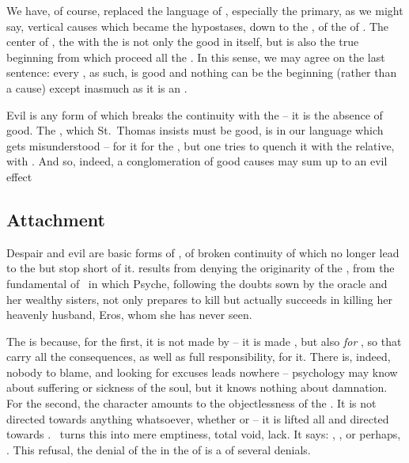 {{We have, of course, replaced the language of , especially the
primary, as we might say, vertical causes which became the hypostases, down to
the , of the  of . The center
of , the  with the  is not only the
good in itself, but is also the true beginning from which proceed all the
. In this sense, we may agree on the last sentence: every
, as such, is good and nothing can be the beginning (rather than a
cause) except inasmuch as it is an . 

Evil is any form of  which breaks the continuity with the
 -- it is the absence of good. The , which St.~Thomas insists must be good, is in our language
 which gets misunderstood -- for it  for the , but one tries to quench it with the relative, with . And
so, indeed, a conglomeration of good causes may sum up to an evil effect
} %

} %


\subsection{Attachment}

\pa Despair and evil are basic forms of , of broken continuity of
 which no longer lead to the  but stop short of
it.  results from denying the originarity of the , 
from the fundamental %
 of \No\ in which {Psyche}, following the doubts sown by
the oracle and her wealthy sisters, not only prepares to kill but actually
succeeds in killing her heavenly husband, {Eros}, whom she has never seen.

The  is  because, for the first, it is not made by
 -- it is made , but also {\em for} , so that 
carry all the consequences, as well as full responsibility, for it. There is,
indeed, nobody to blame, and looking for
excuses %
leads nowhere -- psychology may know about suffering or sickness of the soul,
but it knows nothing about damnation. For the second, the 
character amounts to the  objectlessness of the . It is
not directed towards anything whatsoever, whether  or 
-- it is lifted  all  and directed towards
.  \No\ turns this  into 
mere emptiness, total void, lack. It says: , ,
or perhaps, .
This refusal, the denial of the  in the  of
 is a  of several denials.

